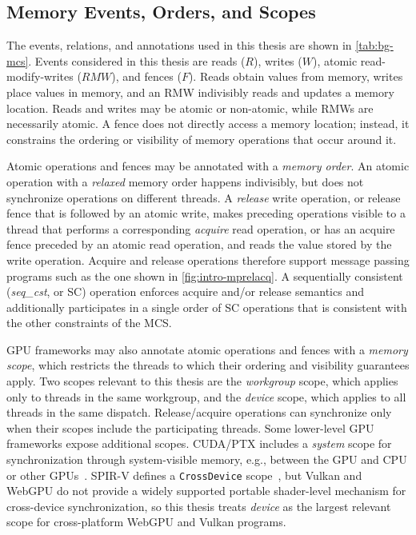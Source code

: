 \subsection{Memory Events, Orders, and Scopes}

The events, relations, and annotations used in this thesis are shown in \mytab\ref{tab:bg-mcs}. Events considered in this thesis are reads ($R$), writes ($W$), atomic read-modify-writes ($RMW$), and fences ($F$). Reads obtain values from memory, writes place values in memory, and an RMW indivisibly reads and updates a memory location. Reads and writes may be atomic or non-atomic, while RMWs are necessarily atomic. A fence does not directly access a memory location; instead, it constrains the ordering or visibility of memory operations that occur around it.

Atomic operations and fences may be annotated with a \textit{memory order}. An atomic operation with a \textit{relaxed} memory order happens indivisibly, but does not synchronize operations on different threads. A \textit{release} write operation, or release fence that is followed by an atomic write, makes preceding operations visible to a thread that performs a corresponding \textit{acquire} read operation, or has an acquire fence preceded by an atomic read operation, and reads the value stored by the write operation. Acquire and release operations therefore support message passing programs such as the one shown in \myfig\ref{fig:intro-mprelacq}. A sequentially consistent (\textit{seq\_cst}, or SC) operation enforces acquire and/or release semantics and additionally participates in a single order of SC operations that is consistent with the other constraints of the MCS.

GPU frameworks may also annotate atomic operations and fences with a \textit{memory scope}, which restricts the threads to which their ordering and visibility guarantees apply. Two scopes relevant to this thesis are the \textit{workgroup} scope, which applies only to threads in the same workgroup, and the \textit{device} scope, which applies to all threads in the same dispatch. Release/acquire operations can synchronize only when their scopes include the participating threads. Some lower-level GPU frameworks expose additional scopes. CUDA/PTX includes a \textit{system} scope for synchronization through system-visible memory, e.g., between the GPU and CPU or other GPUs~\cite{cuda,lustig2019ptx}. SPIR-V defines a \texttt{CrossDevice} scope~\cite{spir-v}, but Vulkan and WebGPU do not provide a widely supported portable shader-level mechanism for cross-device synchronization, so this thesis treats \textit{device} as the largest relevant scope for cross-platform WebGPU and Vulkan programs.

